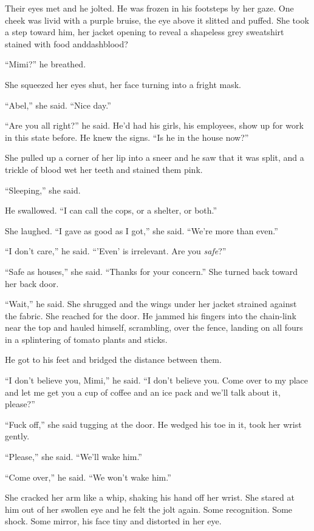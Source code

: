Their eyes met and he jolted.  He was frozen in his footsteps by her
gaze.  One cheek was livid with a purple bruise, the eye above it
slitted and puffed.  She took a step toward him, her jacket opening to
reveal a shapeless grey sweatshirt stained with food anddash{}blood?

``Mimi?'' he breathed.

She squeezed her eyes shut, her face turning into a fright mask.

``Abel,'' she said.  ``Nice day.''

``Are you all right?'' he said.  He'd had his girls, his employees,
show up for work in this state before.  He knew the signs.  ``Is he in
the house now?''

She pulled up a corner of her lip into a sneer and he saw that it was
split, and a trickle of blood wet her teeth and stained them pink.

``Sleeping,'' she said.

He swallowed.  ``I can call the cops, or a shelter, or both.''

She laughed.  ``I gave as good as I got,'' she said.  ``We're more
than even.''

``I don't care,'' he said.  ``'Even' is irrelevant.  Are you
\textit{safe}?''

``Safe as houses,'' she said.  ``Thanks for your concern.'' She turned
back toward her back door.

``Wait,'' he said.  She shrugged and the wings under her jacket
strained against the fabric.  She reached for the door.  He jammed his
fingers into the chain-link near the top and hauled himself,
scrambling, over the fence, landing on all fours in a splintering of
tomato plants and sticks.

He got to his feet and bridged the distance between them.

``I don't believe you, Mimi,'' he said.  ``I don't believe you.  Come
over to my place and let me get you a cup of coffee and an ice pack
and we'll talk about it, please?''

``Fuck off,'' she said tugging at the door.  He wedged his toe in it,
took her wrist gently.

``Please,'' she said.  ``We'll wake him.''

``Come over,'' he said.  ``We won't wake him.''

She cracked her arm like a whip, shaking his hand off her wrist.  She
stared at him out of her swollen eye and he felt the jolt again.  Some
recognition.  Some shock.  Some mirror, his face tiny and distorted in
her eye.

